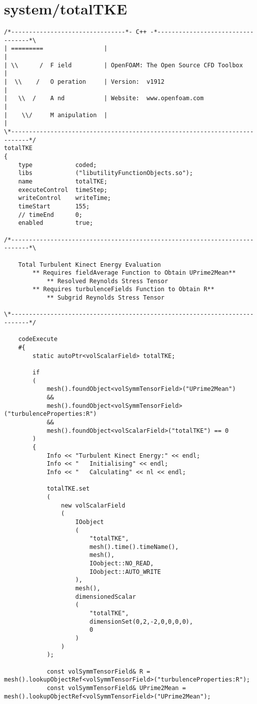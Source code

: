 \section{system/totalTKE}
\begin{lstlisting}
/*--------------------------------*- C++ -*----------------------------------*\
| =========                 |                                                 |
| \\      /  F ield         | OpenFOAM: The Open Source CFD Toolbox           |
|  \\    /   O peration     | Version:  v1912                                 |
|   \\  /    A nd           | Website:  www.openfoam.com                      |
|    \\/     M anipulation  |                                                 |
\*---------------------------------------------------------------------------*/
totalTKE
{
	type			coded;
	libs			("libutilityFunctionObjects.so");
	name			totalTKE;
	executeControl	timeStep;
	writeControl	writeTime;
	timeStart		155;
	// timeEnd		0;
	enabled			true;

/*---------------------------------------------------------------------------*\

	Total Turbulent Kinect Energy Evaluation
		** Requires fieldAverage Function to Obtain UPrime2Mean**
			** Resolved Reynolds Stress Tensor
		** Requires turbulenceFields Function to Obtain R**
			** Subgrid Reynolds Stress Tensor

\*---------------------------------------------------------------------------*/

	codeExecute
	#{
		static autoPtr<volScalarField> totalTKE;

		if
		(
			mesh().foundObject<volSymmTensorField>("UPrime2Mean")
			&&
			mesh().foundObject<volSymmTensorField>("turbulenceProperties:R")
			&&
			mesh().foundObject<volScalarField>("totalTKE") == 0
		)
		{
			Info << "Turbulent Kinect Energy:" << endl;
			Info << "	Initialising" << endl;
			Info << "	Calculating" << nl << endl;

			totalTKE.set
			(
				new volScalarField
				(
					IOobject
					(
						"totalTKE",
						mesh().time().timeName(),
						mesh(),
						IOobject::NO_READ,
						IOobject::AUTO_WRITE
					),
					mesh(),
					dimensionedScalar
					(
						"totalTKE",
						dimensionSet(0,2,-2,0,0,0,0),
						0
					)
				)
			);

			const volSymmTensorField& R = mesh().lookupObjectRef<volSymmTensorField>("turbulenceProperties:R");
			const volSymmTensorField& UPrime2Mean = mesh().lookupObjectRef<volSymmTensorField>("UPrime2Mean");


\end{lstlisting}
